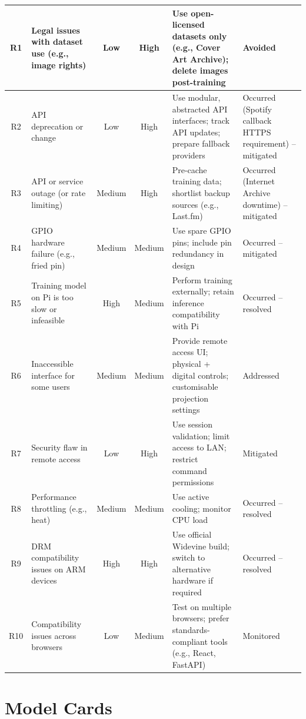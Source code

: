 \begin{uomappendix}
\begin{longtable}{|c|p{3.2cm}|c|c|p{4.1cm}|p{3.0cm}|}
                R1 & Legal issues with dataset use (e.g., image rights) & Low & High & Use open-licensed datasets only (e.g., Cover Art Archive); delete images post-training & Avoided \\ \hline
                R2 & API deprecation or change & Low & High & Use modular, abstracted API interfaces; track API updates; prepare fallback providers & Occurred (Spotify callback HTTPS requirement) -- mitigated \\ \hline 
                R3 & API or service outage (or rate limiting) & Medium & High & Pre-cache training data; shortlist backup sources (e.g., Last.fm) & Occurred (Internet Archive downtime) -- mitigated \\ \hline
                R4 & GPIO hardware failure (e.g., fried pin) & Medium & Medium & Use spare GPIO pins; include pin redundancy in design & Occurred -- mitigated \\ \hline
                R5 & Training model on Pi is too slow or infeasible & High & Medium & Perform training externally; retain inference compatibility with Pi & Occurred -- resolved \\ \hline
                R6 & Inaccessible interface for some users & Medium & Medium & Provide remote access UI; physical + digital controls; customisable projection settings & Addressed \\ \hline
                R7 & Security flaw in remote access & Low & High & Use session validation; limit access to LAN; restrict command permissions & Mitigated \\ \hline
                R8 & Performance throttling (e.g., heat) & Medium & Medium & Use active cooling; monitor CPU load & Occurred -- resolved \\ \hline
                R9 & DRM compatibility issues on ARM devices & High & High & Use official Widevine build; switch to alternative hardware if required & Occurred -- resolved \\ \hline
                R10 & Compatibility issues across browsers & Low & Medium & Test on multiple browsers; prefer standards-compliant tools (e.g., React, FastAPI) & Monitored \\ \hline
            \end{longtable}
    
        \section{Model Cards} \label{sec:mcard}
        

\end{uomappendix}
